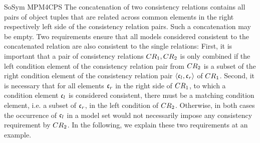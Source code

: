 \begin{copiedFrom}{SoSym MPM4CPS}
The concatenation of two consistency relations contains all pairs of object tuples that are related across common elements in the right respectively left side of the consistency relation pairs.
Such a concatenation may be empty.
Two requirements ensure that all models considered consistent to the concatenated relation are also consistent to the single relations:
First, it is important that a pair of consistency relations $CR_{1}, CR_{2}$ is only combined if the left condition element of the consistency relation pair from $CR_{2}$ is a subset of the right condition element of the consistency relation pair $\langle \mathfrak{c}_{l}, \mathfrak{c}_{r} \rangle$ of $CR_{1}$.
Second, it is necessary that for all elements $\mathfrak{c}_{r}$ in the right side of $CR_{1}$, to which a condition element $\mathfrak{c}_{l}$ is considered consistent, there must be a matching condition element, i.e. a subset of $\mathfrak{c}_{r}$, in the left condition of $CR_{2}$.
Otherwise, in both cases the occurrence of $\mathfrak{c}_{l}$ in a model set would not necessarily impose any consistency requirement by $CR_{2}$.
In the following, we explain these two requirements at an example.





\end{copiedFrom}
